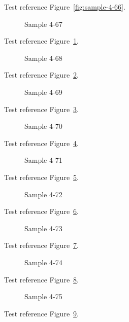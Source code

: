 Test reference Figure~\ref{fig:sample-4-66}.

\begin{figure}[tbhp]
\caption{Sample 4-67}
\label{fig:sample-4-67}
\end{figure}

Test reference Figure~\ref{fig:sample-4-67}.

\begin{figure}[tbhp]
\caption{Sample 4-68}
\label{fig:sample-4-68}
\end{figure}

Test reference Figure~\ref{fig:sample-4-68}.

\begin{figure}[tbhp]
\caption{Sample 4-69}
\label{fig:sample-4-69}
\end{figure}

Test reference Figure~\ref{fig:sample-4-69}.

\begin{figure}[tbhp]
\caption{Sample 4-70}
\label{fig:sample-4-70}
\end{figure}

Test reference Figure~\ref{fig:sample-4-70}.

\begin{figure}[tbhp]
\caption{Sample 4-71}
\label{fig:sample-4-71}
\end{figure}

Test reference Figure~\ref{fig:sample-4-71}.

\begin{figure}[tbhp]
\caption{Sample 4-72}
\label{fig:sample-4-72}
\end{figure}

Test reference Figure~\ref{fig:sample-4-72}.

\begin{figure}[tbhp]
\caption{Sample 4-73}
\label{fig:sample-4-73}
\end{figure}

Test reference Figure~\ref{fig:sample-4-73}.

\begin{figure}[tbhp]
\caption{Sample 4-74}
\label{fig:sample-4-74}
\end{figure}

Test reference Figure~\ref{fig:sample-4-74}.

\begin{figure}[tbhp]
\caption{Sample 4-75}
\label{fig:sample-4-75}
\end{figure}

Test reference Figure~\ref{fig:sample-4-75}.

